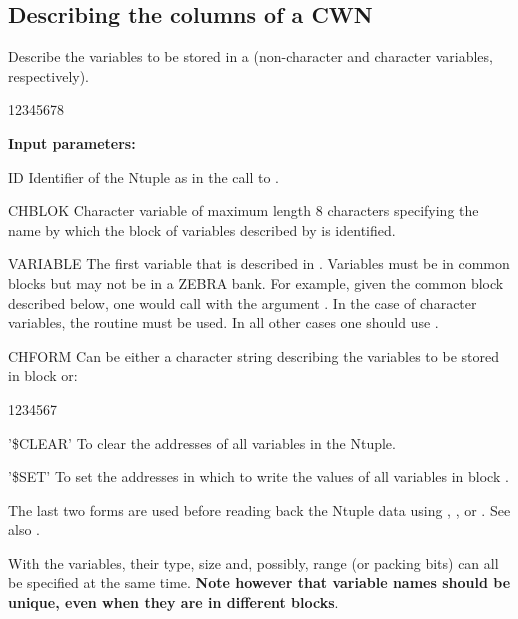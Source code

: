 
\subsection{Describing the columns of a CWN}
\label{HNTUDESC}


\Action
Describe the variables to be stored in a \CWN{}
(non-character and character variables, respectively).

\begin{DLttc}{12345678}
\item[{\rm\bf Input parameters:}]
\item[ID]     Identifier of the Ntuple as in the call to .
\item[CHBLOK] Character variable of maximum length 8 characters
              specifying the name by which the block
              of variables described by  is identified.
\item[VARIABLE]
              The first variable that is described in .
              Variables must be in common blocks but may not be
              in a ZEBRA bank.
              For example, given the common block  described
              below, one would call  with the argument .
              In the case of character variables, the routine
               must be used. In all other cases one
              should use .
\item[CHFORM] Can be either a character string describing the variables
              to be stored in block  or:
   \begin{DLttc}{1234567}
     \item['\$CLEAR'] To clear the addresses of all variables in the Ntuple.
     \item['\$SET'] To set the addresses in which to write the values of
                    all variables in block .
   \end{DLttc}
             The last two forms are used before reading back the Ntuple data
             using , ,  or .
             See also .
\end{DLttc}

With  the variables, their type, size and, possibly, range
(or packing bits) can all be specified at the same time.
{\bf Note however that variable names should be unique, even when
they are in different blocks}.

